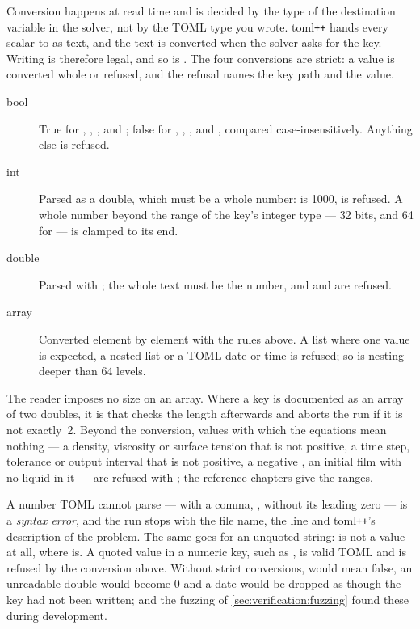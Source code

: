 Conversion happens at read time and is decided by the type of the destination
variable in the solver, not by the TOML type you wrote. toml\texttt{++} hands
every scalar to  as text, and the text is converted
when the solver asks for the key. Writing  is therefore legal,
and so is . The four conversions are strict: a value is converted whole or refused, and
the refusal names the key path and the value.

\begin{description}
  \item[bool] True for , , ,  and
    ; false for , , ,  and
    , compared case-insensitively. Anything else is refused.
  \item[int] Parsed as a double, which must be a whole number:  is
    1000,  is refused. A whole number beyond the range of the
    key's integer type --- 32 bits, and 64 for  --- is
    clamped to its end.
  \item[double] Parsed with ; the whole text must be the number,
    and  and  are refused.
  \item[array] Converted element by element with the rules above. A list
    where one value is expected, a nested list or a TOML date or time is
    refused; so is nesting deeper than 64 levels.
\end{description}

The reader imposes no size on an array. Where a key is documented as an array
of two doubles, it is  that checks the length afterwards and
aborts the run if it is not exactly~2. Beyond the conversion, values with
which the equations mean nothing --- a density, viscosity or surface tension
that is not positive, a time step, tolerance or output interval that is not
positive, a negative , an initial film with no liquid in it ---
are refused with ; the reference
chapters give the ranges.

\begin{note}
  A number TOML cannot parse ---  with a comma, ,
   without its leading zero --- is a \emph{syntax error}, and the run
  stops with the file name, the line and toml\texttt{++}'s description of the
  problem. The same goes for an unquoted string:  is not a
  value at all, where  is. A quoted value in a numeric
  key, such as , is valid TOML and is refused by the
  conversion above. Without strict conversions,  would mean false, an unreadable double would become 0 and a date
  would be dropped as though the key had not been written;
   and the fuzzing of
  \cref{sec:verification:fuzzing} found these during development.
\end{note}


